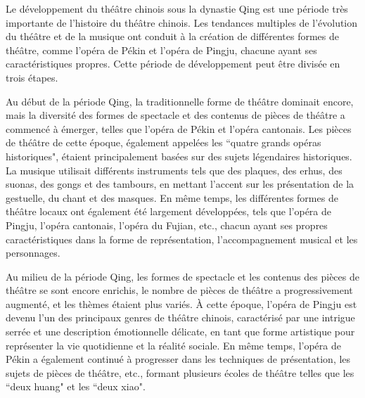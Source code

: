 \documentclass[UTF8,a4paper,12pt]{ctexart}
\numberwithin{equation}{section}
\newcommand{\mycite}[1]{\cite{#1}}
\begin{document}
Le développement du théâtre chinois sous la dynastie Qing est une période très importante de l'histoire du théâtre chinois. Les tendances multiples de l'évolution du théâtre et de la musique ont conduit à la création de différentes formes de théâtre, comme l'opéra de Pékin et l'opéra de Pingju, chacune ayant ses caractéristiques propres. Cette période de développement peut être divisée en trois étapes\mycite{44}.

Au début de la période Qing, la traditionnelle forme de théâtre dominait encore, mais la diversité des formes de spectacle et des contenus de pièces de théâtre a commencé à émerger, telles que l'opéra de Pékin et l'opéra cantonais. Les pièces de théâtre de cette époque, également appelées les ``quatre grands opéras historiques", étaient principalement basées sur des sujets légendaires historiques. La musique utilisait différents instruments tels que des plaques, des erhus, des suonas, des gongs et des tambours, en mettant l'accent sur les présentation de la gestuelle, du chant et des masques. En même temps, les différentes formes de théâtre locaux ont également été largement développées, tels que l'opéra de Pingju, l'opéra cantonais, l'opéra du Fujian, etc., chacun ayant ses propres caractéristiques dans la forme de représentation, l'accompagnement musical et les personnages.

Au milieu de la période Qing, les formes de spectacle et les contenus des pièces de théâtre se sont encore enrichis, le nombre de pièces de théâtre a progressivement augmenté, et les thèmes étaient plus variés. À cette époque, l'opéra de Pingju est devenu l'un des principaux genres de théâtre chinois, caractérisé par une intrigue serrée et une description émotionnelle délicate, en tant que forme artistique pour représenter la vie quotidienne et la réalité sociale. En même temps, l'opéra de Pékin a également continué à progresser dans les techniques de présentation, les sujets de pièces de théâtre, etc., formant plusieurs écoles de théâtre telles que les ``deux huang" et les ``deux xiao".
\end{document}
